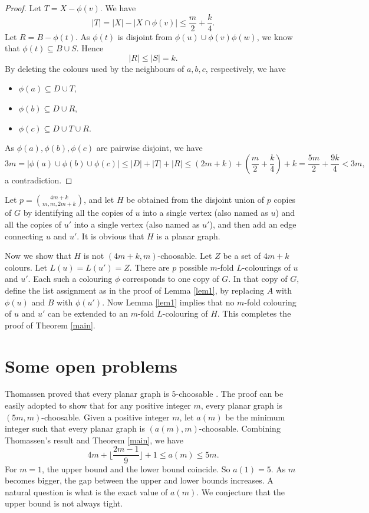\documentclass[12pt]{article}
\begin{document}
\begin{proof}
	Let $T=X-\phi(v)$. We have $$|T|=|X|-|X \cap \phi(v)| \le \frac m2 + \frac k4.$$
	Let $R=B - \phi(t)$. As $\phi(t)$ is disjoint from $\phi(u) \cup \phi(v) \phi(w)$,
	we know that $\phi(t) \subseteq B \cup S$. Hence
	$$|R|\le |S|= k.$$
By deleting the colours used by the neighbours of $a,b,c$, respectively, we have
	\begin{itemize}
		\item $\phi(a) \subseteq D \cup T$,
		\item $\phi(b) \subseteq D \cup R$,
		\item $\phi(c) \subseteq D \cup T \cup R$.
	\end{itemize}
	As $\phi(a),\phi(b),\phi(c)$ are pairwise disjoint, we have
	$$3m = |\phi(a) \cup \phi(b) \cup \phi(c)| \le |D|+|T|+|R| 
	\le (2m+k)+\left(\frac m2 + \frac k4\right) + k = \frac{5m}{2}+ \frac{9k}{4} < 3m,$$
	a contradiction.
\end{proof}
 
Let $p={4m+k \choose m, m,2m+k}$, and let $H$ be obtained from the disjoint union of $p$ copies of $G$ by identifying all the copies of $u$ into a single vertex (also named as $u$) and all the copies of $u'$ into a single vertex (also named as $u'$), and then add an edge connecting $u$ and $u'$. It is obvious that $H$ is a planar graph. 

Now we show that   $H$ is not $(4m+k,m)$-choosable.  Let $Z$ be a set of $4m+k$ colours.
Let $L(u)=L(u')=Z$. There are $p$ possible $m$-fold $L$-colourings of $u$ and $u'$. Each such a colouring $\phi$ corresponds to one copy of $G$. In that copy of $G$, define the list assignment as in the proof of Lemma \ref{lem1}, by replacing $A$ with $\phi(u)$ and $B$ with $\phi(u')$.  Now Lemma \ref{lem1} implies that no $m$-fold colouring of $u$ and $u'$ can be extended to an $m$-fold $L$-colouring of $H$. This completes the proof of Theorem \ref{main}.


\section{Some open problems}

Thomassen proved that every planar graph is $5$-choosable \cite{Tho1994}. The proof can be easily adopted to show that for any positive integer $m$, every planar graph is $(5m,m)$-choosable. Given a positive integer $m$, let $a(m)$ be the minimum integer such that every planar graph is $(a(m),m)$-choosable.
Combining Thomassen's result and Theorem \ref{main}, we have $$4m+\lfloor \frac{2m-1}{9}\rfloor+1 \le a(m) \le 5m.$$
 For $m=1$, the upper bound and the lower bound coincide. So $a(1)=5$. As $m$ becomes bigger, the gap between the upper and lower bounds increases.
 A natural question is what is the exact value of $a(m)$. We conjecture that the upper bound is not always tight.
 
\end{document}
